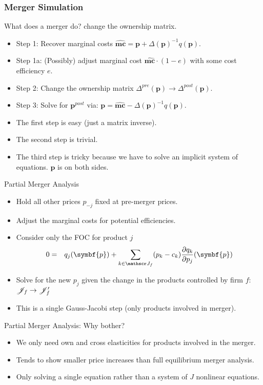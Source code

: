 \documentclass[aspectratio=169,10pt]{beamer}
\begin{document}
\begin{frame}
\frametitle{Merger Simulation}
What does a merger do? \alert{change the ownership matrix}.
\begin{itemize}

\item Step 1: Recover marginal costs $\widehat{\symbf{mc}} = \symbf{p} +\Delta(\symbf{p})^{-1}q(\symbf{p})$.
\item Step 1a: (Possibly) adjust marginal cost $\widehat{\symbf{mc}}\cdot (1-e)$ with some cost efficiency $e$.
\item Step 2: Change the ownership matrix $\Delta^{pre}(\symbf{p}) \rightarrow \Delta^{post}(\symbf{p})$.
\item Step 3: Solve for $\symbf{p}^{post}$ via: $\symbf{p} = \widehat{\symbf{mc}} - \Delta(\symbf{p})^{-1}q(\symbf{p})$.
\end{itemize}
\pause
\vspace{0.5cm}
\begin{itemize}
\item The first step is easy (just a matrix inverse).
\item The second step is trivial.
\item The third step is tricky because we have to solve an implicit system of equations. $\symbf{p}$ is on both sides.
\end{itemize}
\end{frame}


\begin{frame}{Partial Merger Analysis}
\begin{itemize}
\item Hold all other prices $p_{-j}$ fixed at \alert{pre-merger} prices.
\item Adjust the marginal costs for potential efficiencies.
\item Consider only the FOC for product $j$
\begin{eqnarray*}
0&=& q_j(\symbf{p}) + \sum_{k \in \calJ_f} (p_k - c_k) \frac{\partial q_{k}}{\partial p_j}(\symbf{p})
\end{eqnarray*}
\item Solve for the new $p_j$ given the change in the products controlled by firm $f$: $\mathscr{J}_f \rightarrow \mathscr{J}_f'$
\item This is a single Gauss-Jacobi step (only products involved in merger).
\end{itemize}
\end{frame} 

\begin{frame}{Partial Merger Analysis: Why bother?}
\begin{itemize}
\item We only need own and cross elasticities for products involved in the merger.
\item Tends to show smaller price increases than full equilibrium merger analysis.
\item Only solving a single equation rather than a system of $J$ nonlinear equations.
\end{itemize}
\end{frame} 
\end{document}
